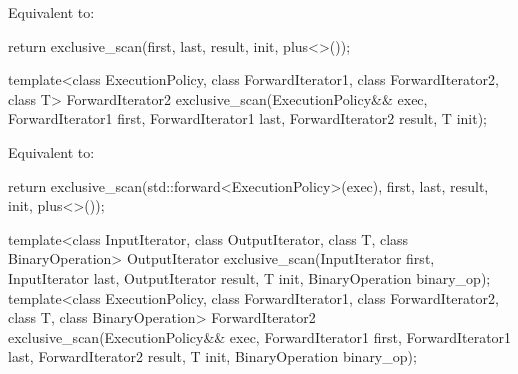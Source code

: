 \begin{itemdescr}
\pnum
\effects Equivalent to:
\begin{codeblock}
return exclusive_scan(first, last, result, init, plus<>());
\end{codeblock}
\end{itemdescr}

%
\begin{itemdecl}
template<class ExecutionPolicy, class ForwardIterator1, class ForwardIterator2, class T>
  ForwardIterator2 exclusive_scan(ExecutionPolicy&& exec,
                                  ForwardIterator1 first, ForwardIterator1 last,
                                  ForwardIterator2 result, T init);
\end{itemdecl}

\begin{itemdescr}
\pnum
\effects Equivalent to:
\begin{codeblock}
return exclusive_scan(std::forward<ExecutionPolicy>(exec),
                      first, last, result, init, plus<>());
\end{codeblock}
\end{itemdescr}

%
\begin{itemdecl}
template<class InputIterator, class OutputIterator, class T, class BinaryOperation>
  OutputIterator exclusive_scan(InputIterator first, InputIterator last,
                                OutputIterator result, T init, BinaryOperation binary_op);
template<class ExecutionPolicy,
         class ForwardIterator1, class ForwardIterator2, class T, class BinaryOperation>
  ForwardIterator2 exclusive_scan(ExecutionPolicy&& exec,
                                  ForwardIterator1 first, ForwardIterator1 last,
                                  ForwardIterator2 result, T init, BinaryOperation binary_op);
\end{itemdecl}

